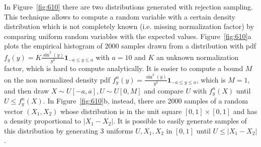 \documentclass[10pt]{article}
\begin{document}
In Figure~\ref{fig:610} there are two distributions generated with rejection sampling. This technique allows to compute a random variable with a certain density distribution which is not completely known (i.e. missing normalization factor) by comparing uniform random variables with the expected values. Figure~\ref{fig:610}a plots the empirical histogram of 2000 samples drawn from a distribution with pdf $f_y(y) = K \frac{\sin^2(y)}{y^2} \mathbf{1}_{-a\le y\le a}$ with $a =10$ and $K$ an unknown normalization factor, which is hard to compute analytically. It is easier to compute a bound $M$ on the non normalized density pdf $f^n_{y}(y) = \frac{\sin^2(y)}{y^2} \mathbf{1}_{-a\le y\le a}$,
which is $M = 1$, and then draw $X \sim U[-a, a], U \sim U[0, M]$ and compare $U$ with $f^n_y(X)$ until $U \le f^n_y(X)$.
In Figure~\ref{fig:610}b, instead, there are 2000 samples of a random vector $(X_1, X_2)$ whose distribution is in the unit square $[0,1]\times[0,1]$ and has a density proportional to $|X_1 - X_2|$. It is possible to easily generate samples of this distribution by generating 3 uniforms $U, X_1, X_2$ in $[0,1]$ until $U \le |X_1 - X_2|$.
\end{document}
